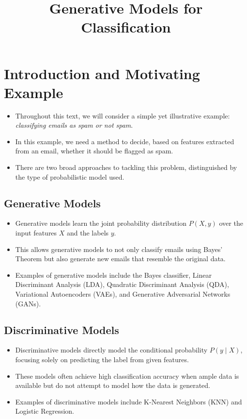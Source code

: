 \documentclass[10pt]{article}
\title{Generative Models for Classification}
\author{}
\date{}
\begin{document}
\maketitle

\section{Introduction and Motivating Example}

\begin{itemize}
    \item Throughout this text, we will consider a simple yet illustrative example: \textit{classifying emails as spam or not spam}.
    \item In this example, we need a method to decide, based on features extracted from an email, whether it should be flagged as spam.
    \item There are two broad approaches to tackling this problem, distinguished by the type of probabilistic model used.
\end{itemize}

\subsection{Generative Models}
\begin{itemize}
    \item Generative models learn the joint probability distribution \(P(X,y)\) over the input features \(X\) and the labels \(y\).
    \item This allows generative models to not only classify emails using Bayes’ Theorem but also generate new emails that resemble the original data.
    \item Examples of generative models include the Bayes classifier, Linear Discriminant Analysis (LDA), Quadratic Discriminant Analysis (QDA), Variational Autoencoders (VAEs), and Generative Adversarial Networks (GANs).
\end{itemize}

\subsection{Discriminative Models}
\begin{itemize}
    \item Discriminative models directly model the conditional probability \(P(y \mid X)\), focusing solely on predicting the label from given features.
    \item These models often achieve high classification accuracy when ample data is available but do not attempt to model how the data is generated.
    \item Examples of discriminative models include K-Nearest Neighbors (KNN) and Logistic Regression.
\end{itemize}
\end{document}
